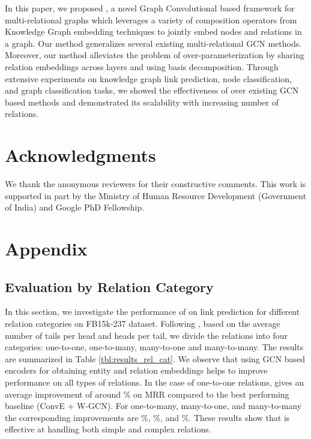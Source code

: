 \documentclass{article} \usepackage{iclr2020_conference,times}
\begin{document}
In this paper, we proposed \method{}, a novel Graph Convolutional based framework for multi-relational graphs which leverages a variety of composition operators from Knowledge Graph embedding techniques to jointly embed nodes and relations in a  graph. Our method generalizes several existing multi-relational GCN methods. Moreover, our method alleviates the problem of over-parameterization by sharing relation embeddings across layers and using basis decomposition. Through extensive experiments on knowledge graph link prediction, node classification, and graph classification tasks, we showed the effectiveness of \method{} over existing GCN based methods and demonstrated its scalability with increasing number of relations.
 
\section*{Acknowledgments}
We thank the anonymous reviewers for their constructive comments. This work is supported in part by the Ministry of Human Resource Development (Government of India) and Google PhD Fellowship.





\newpage
\appendix
\section{Appendix}


\subsection{Evaluation by Relation Category}
\label{sec:results_rel_cat}
In this section, we investigate the performance of \method{} on link prediction for different relation categories on FB15k-237 dataset. Following \citet{kg_relation_cat,rotate}, based on the average number of tails per head and heads per tail, we divide the relations into four categories: one-to-one, one-to-many, many-to-one and many-to-many. The results are summarized in Table \ref{tbl:results_rel_cat}. We observe that using GCN based encoders for obtaining entity and relation embeddings helps to improve performance on all types of relations. In the case of one-to-one relations, \method{} gives an average improvement of around \% on MRR compared to the best performing baseline (ConvE + W-GCN). For one-to-many, many-to-one, and many-to-many the corresponding improvements are \%, \%, and \%. These results show that \method{} is effective at handling both simple and complex relations.
\end{document}
